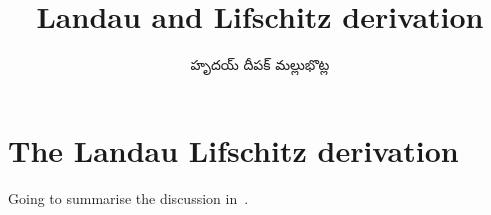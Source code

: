\documentclass[../main.tex]{subfiles}
\title{Landau and Lifschitz derivation}
\author{\begin{telugu}హృదయ్ దీపక్ మల్లుభొట్ల\end{telugu}}
\date{}
\begin{document}
	\onlyinsubfile{\maketitle}
	\section{The Landau Lifschitz derivation} \label{sec:LLDer}

	Going to summarise the discussion in~\cite{llv9}.
\end{document}
